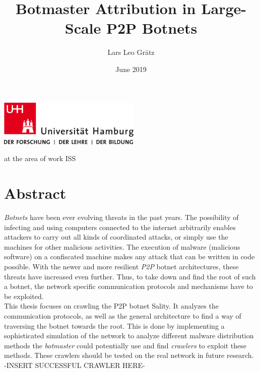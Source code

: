 \documentclass{article}
\title{Botmaster Attribution in Large-Scale P2P Botnets}
\author{Lars Leo Grätz}
\date{June 2019}
\begin{document}
\begin{titlepage}
\includegraphics[width=6.8cm]{logos/up-uhh-logo-u-2010-u-farbe-u-rgb.pdf}
\begin{center}\Large
    \vfill
    \makeatletter
    {\Large\textsf{\textbf{\@title}}\par}
    \makeatother
    \bigskip
    at the area of work ISS \par
    \bigskip
    \makeatletter
    {\@author} \par
    \makeatother
    \bigskip
    \makeatletter
    {\@date}
    \makeatother
    \vfill
    \vfill
\end{center}
\end{titlepage}

\section*{Abstract}
\emph{Botnets} have been ever evolving threats in the past years. The possibility of infecting and using computers connected to the internet arbitrarily enables attackers to carry out all kinds of coordinated attacks, or simply use the machines for other malicious activities. The execution of malware (malicious software) on a confiscated machine makes any attack that can be written in code possible. With the newer and more resilient \emph{P2P} botnet architectures, these threats have increased even further. Thus, to take down and find the root of such a botnet, the network specific communication protocols and mechanisms have to be exploited. \\

This thesis focuses on crawling the P2P botnet Sality. It analyzes the communication protocols, as well as the general architecture to find a way of traversing the botnet towards the root. This is done by implementing a sophisticated simulation of the network to analyze different malware distribution methods the \emph{botmaster} could potentially use and find \emph{crawlers} to exploit these methods. These crawlers should be tested on the real network in future research.
-INSERT SUCCESSFUL CRAWLER HERE-

\newpage

\tableofcontents

\newpage
\end{document}
